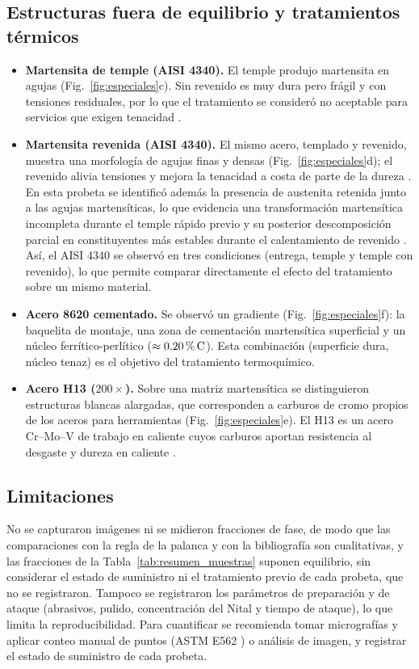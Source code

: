 \documentclass[journal,11pt]{IEEEtran}
\newcommand{\pC}[1]{\ensuremath{#1\mskip\thinmuskip\mathchar"0025\mskip\thinmuskip\mathrm{C}}}
\begin{document}
\subsection{Estructuras fuera de equilibrio y tratamientos térmicos}
\begin{itemize}
    \item \textbf{Martensita de temple (AISI 4340).} El temple produjo martensita en agujas (Fig.~\ref{fig:especiales}c). Sin revenido es muy dura pero frágil y con tensiones residuales, por lo que el tratamiento se consideró no aceptable para servicios que exigen tenacidad \cite{callister}.
    \item \textbf{Martensita revenida (AISI 4340).} El mismo acero, templado y revenido, muestra una morfología de agujas finas y densas (Fig.~\ref{fig:especiales}d); el revenido alivia tensiones y mejora la tenacidad a costa de parte de la dureza \cite{callister,asm9}. En esta probeta se identificó además la presencia de austenita retenida junto a las agujas martensíticas, lo que evidencia una transformación martensítica incompleta durante el temple rápido previo y su posterior descomposición parcial en constituyentes más estables durante el calentamiento de revenido \cite{clarke}. Así, el AISI 4340 se observó en tres condiciones (entrega, temple y temple con revenido), lo que permite comparar directamente el efecto del tratamiento sobre un mismo material.
    \item \textbf{Acero 8620 cementado.} Se observó un gradiente (Fig.~\ref{fig:especiales}f): la baquelita de montaje, una zona de cementación martensítica superficial y un núcleo ferrítico-perlítico ($\approx\pC{0.20}$). Esta combinación (superficie dura, núcleo tenaz) es el objetivo del tratamiento termoquímico.
    \item \textbf{Acero H13 ($200\times$).} Sobre una matriz martensítica se distinguieron estructuras blancas alargadas, que corresponden a carburos de cromo propios de los aceros para herramientas (Fig.~\ref{fig:especiales}e). El H13 es un acero Cr--Mo--V de trabajo en caliente cuyos carburos aportan resistencia al desgaste y dureza en caliente \cite{asm9}.
\end{itemize}

\subsection{Limitaciones}
No se capturaron imágenes ni se midieron fracciones de fase, de modo que las comparaciones con la regla de la palanca y con la bibliografía son cualitativas, y las fracciones de la Tabla~\ref{tab:resumen_muestras} suponen equilibrio, sin considerar el estado de suministro ni el tratamiento previo de cada probeta, que no se registraron. Tampoco se registraron los parámetros de preparación y de ataque (abrasivos, pulido, concentración del Nital y tiempo de ataque), lo que limita la reproducibilidad. Para cuantificar se recomienda tomar micrografías y aplicar conteo manual de puntos (ASTM E562 \cite{astm_e562}) o análisis de imagen, y registrar el estado de suministro de cada probeta.
\end{document}

